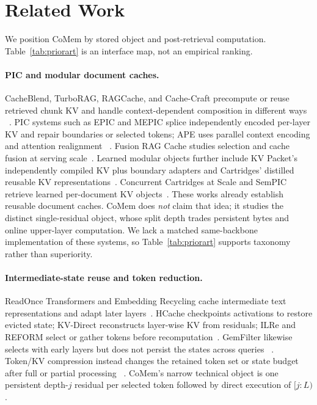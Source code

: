 \section{Related Work}
\label{sec:related}

We position CoMem by stored object and post-retrieval computation.
Table~\ref{tab:priorart} is an interface map, not an empirical ranking.



\paragraph{PIC and modular document caches.}
CacheBlend, TurboRAG, RAGCache, and Cache-Craft precompute or reuse retrieved
chunk KV and handle context-dependent composition in different ways
~\citep{cacheblend,turborag,ragcache,cachecraft}. PIC systems such as EPIC and
MEPIC splice independently encoded per-layer KV and repair boundaries or
selected tokens; APE uses parallel context encoding and attention realignment
~\citep{epic,mepic,ape}. Fusion RAG Cache studies selection and cache fusion at
serving scale~\citep{fusionrag}. Learned modular objects further include KV
Packet's independently compiled KV plus boundary adapters and Cartridges'
distilled reusable KV representations~\citep{kvpacket,cartridgesbase}.
Concurrent Cartridges at Scale and SemPIC retrieve learned per-document KV
objects~\citep{cartridges,sempic}. These works already establish reusable
document caches. CoMem does \emph{not} claim that idea; it studies the distinct
single-residual object, whose split depth trades persistent bytes and online
upper-layer computation. We lack a matched same-backbone implementation of
these systems, so Table~\ref{tab:priorart} supports taxonomy rather than
superiority.

\paragraph{Intermediate-state reuse and token reduction.}
ReadOnce Transformers and Embedding Recycling cache intermediate text
representations and adapt later layers~\citep{readonce,embeddingrecycling}.
HCache checkpoints activations to restore evicted state; KV-Direct reconstructs
layer-wise KV from residuals; ILRe and REFORM select or gather tokens before
recomputation~\citep{hcache,kvdirect,ilre,reform}. GemFilter likewise selects
with early layers but does not persist the states across queries
~\citep{gemfilter}. Token/KV compression instead changes the retained token set
or state budget after full or partial processing
~\citep{streamingllm,h2o,snapkv,pyramidkv,minicache}. CoMem's narrow technical
object is one persistent depth-$j$ residual per selected token followed by
direct execution of $[j{:}L)$.

